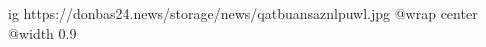  
 
 
 
 

\ifcmt
  ig https://donbas24.news/storage/news/qatbuansaznlpuwl.jpg
  @wrap center
  @width 0.9
\fi
